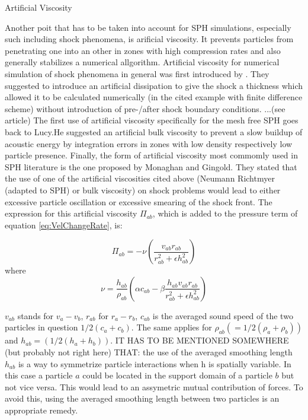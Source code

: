 \documentclass{report}
\begin{document}
Artificial Viscosity

Another poit that has to be taken into account for SPH simulations, especially
such including shock phenomena, is arificial viscosity\cite{Monaghan2005}. It
prevents particles from penetrating one into an other in zones with high
compression rates and also generally stabilizes a numerical
allgorithm.
Artificial viscosity for numerical simulation of shock phenomena
in general was first introduced by \cite{vonNeumann1950}. They suggested to
introduce an artificial dissipation to give the shock a thickness which
allowed it to be calculated numerically (in the cited example with finite difference
scheme) without introduction of pre-/after shock boundary conditions.    ...(see article)
The first use of artificial viscosity specifically for the mesh free SPH goes
back to Lucy\cite{Lucy1977}.He suggested an artificial bulk viscosity to
prevent a slow buildup of acoustic energy by integration errors in zones with
low density respectively low particle presence. 
Finally, the form of artificial viscosity most commomly used in SPH
literature\cite{Liu2003} is the one proposed by Monaghan and
Gingold\cite{Monaghan1983}. They stated that the use of one of the artificial
viscosities cited above (Neumann Richtmyer (adapted to SPH) or bulk
viscosity) on shock problems would lead to either excessive particle
oscillation or excessive smearing of the shock front. The expression for this
artificial viscosity $\Pi_{ab}$, which is added to the pressure term of
equation \ref{eq:VelChangeRate}, is:

\begin{equation}
\Pi _{\mathit{ab}}=-\nu
(\frac{v_{\mathit{ab}}r_{\mathit{ab}}}{r_{\mathit{ab}}^{2}+\epsilon
h_{\mathit{ab}}^{2}})
\end{equation}
where 
\begin{equation}
\nu =\frac{h_{\mathit{ab}}}{\rho _{\mathit{ab}}}(\alpha
c_{\mathit{ab}}-\beta
\frac{h_{\mathit{ab}}v_{\mathit{ab}}r_{\mathit{ab}}}{r_{\mathit{ab}}^{2}+\epsilon
h_{\mathit{ab}}^{2}})
\end{equation}

$v_{ab}$ stands for $v_a-v_b$, $r_{ab}$ for $r_a-r_b$, $c_{ab}$ is the
averaged sound speed of the two particles in question $1/2(c_a+c_b)$. The same
applies for $\rho_{ab}(=1/2(\rho_a+\rho_b))$ and $h_{ab}=(1/2(h_a+h_b))$. IT
HAS TO BE MENTIONED SOMEWHERE (but probably not right here) THAT: the use of
the averaged smoothing length $h_{ab}$ is a way to symmetrize particle
interactions when h is spatially variable. In this case a particle $a$ could be
located in the support domain of a particle $b$ but not vice versa. This would
lead to an assymetric mutual contribution of forces. To avoid this, using the
averaged smoothing length between two particles is an appropriate remedy\cite{Liu2003}.
\end{document}
